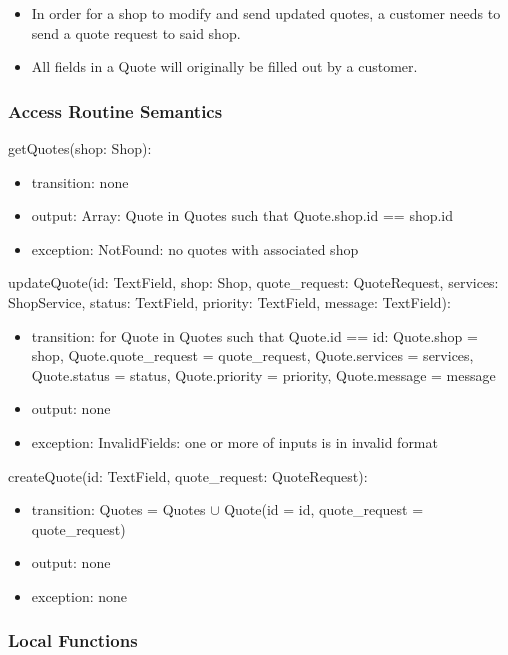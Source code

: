 \documentclass[12pt, titlepage]{article}
\begin{document}
\begin{itemize}
    \item In order for a shop to modify and send updated quotes, a customer needs to send a quote request to said shop.
    \item All fields in a Quote will originally be filled out by a customer.
\end{itemize}

\subsubsection{Access Routine Semantics}

\noindent getQuotes(shop: Shop):
\begin{itemize}
    \item transition: none
    \item output: Array: Quote in Quotes such that Quote.shop.id == shop.id
    \item exception: NotFound: no quotes with associated shop
\end{itemize}

\noindent updateQuote(id: TextField, shop: Shop, quote\_request: QuoteRequest, services: ShopService, status: TextField, priority: TextField, message: TextField):
\begin{itemize}
    \item transition: for Quote in Quotes such that Quote.id == id: Quote.shop = shop, Quote.quote\_request = quote\_request, Quote.services = services, Quote.status = status, Quote.priority = priority, Quote.message = message
    \item output: none
    \item exception: InvalidFields: one or more of inputs is in invalid format
\end{itemize}

\noindent createQuote(id: TextField, quote\_request: QuoteRequest):
\begin{itemize}
    \item transition: Quotes = Quotes $\cup$ Quote(id = id, quote\_request = quote\_request)
    \item output: none
    \item exception: none
\end{itemize}

\subsubsection{Local Functions}
\end{document}
